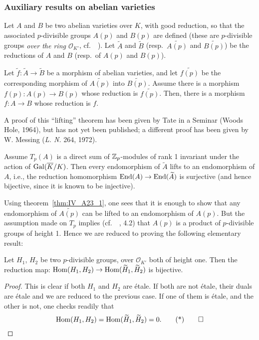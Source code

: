 \begin{subappendices}
\subsubsection{Auxiliary results on abelian varieties}
\label{sec:IV_A23}
Let $A$ and $B$ be two abelian varieties over $K$,
\dpage
with good reduction, so that the associated $p$-divisible groups $A(p)$ and
$B(p)$ are defined (these are $p$-divisible groups \emph{over the ring
$\mathcal{O}_{K'}$}, cf.\ \citeauthor{39}~\cite{39}). Let $\widetilde{A}$ and
$\widetilde{B}$ (resp.\ $\widetilde{A(p)}$ and $\widetilde{B(p)}$) be the
reductions of $A$ and $B$ (resp.\ of $A(p)$ and $B(p)$).

\begin{thm}\label{thm:IV_A23_1}
	Let $\tilde f \colon \widetilde A \to \widetilde B$ be a morphism of
	abelian varieties, and let $\widetilde{f(p)}$ be the corresponding
	morphism of $\widetilde{A(p)}$ into $\widetilde{B(p)}$.  Assume there
	is a morphism $f(p) \colon A(p) \to B(p)$ whose reduction is
	$\widetilde{f(p)}$. Then, there is a morphism $f \colon A \to B$ whose
	reduction is $f$.
\end{thm}
A proof of this ``lifting'' theorem has been given by Tate in a Seminar (Woods
Hole, 1964), but has not yet been published;
a different proof has been given by W. Messing (\emph{L. N.} 264, 1972).

\begin{thm}\label{thm:IV_A23_2}
	Assume $T_p(A)$ is a direct sum of $\mathbb{Z}_p$-modules of rank 1 invariant
	under the action of $\operatorname{Gal}(\overline{K}/K)$. Then every endomorphism of
	$\widetilde{A}$ lifts to an endomorphism of $A$, i.e., the reduction
	homomorphism $\operatorname{End}(A) \to \operatorname{End}(\widetilde A)$ is surjective (and hence
	bijective, since it is known to be injective).
\end{thm}
Using theorem~\ref{thm:IV_A23_1}, one sees that it is enough to show that any
endomorphism of $\widetilde{A(p)}$ can be lifted to an endomorphism of $A(p)$.
But the assumption made on $T_p$ implies (cf.\ \citeauthor{39}~\cite{39}, 4.2)
that $A(p)$ is a product of $p$-divisible groups of height 1. Hence we are
reduced to proving the following elementary result:

\begin{lem}
	Let $H_1$, $H_2$ be two $p$-divisible groups, over $\mathcal{O}_{K'}$
	both of height one. Then the reduction map: $\operatorname{Hom}(H_1, H_2) \to
	\operatorname{Hom}(\widetilde{H}_1, \widetilde{H}_2)$ is bijective.
\end{lem}
\begin{proof}
	This is clear if both $H_1$ and $H_2$ are étale.
	\dpage
	If both are not étale, their duals are étale and we are reduced to the
	previous case.  If one of them is étale, and the other is not, one
	checks readily that
	\begin{equation}
		\Hom(H_1, H_2) = \Hom(\widetilde{H}_1, \widetilde{H}_2) = 0.
		\tqedhere
	\end{equation}
\end{proof}


\end{subappendices}
